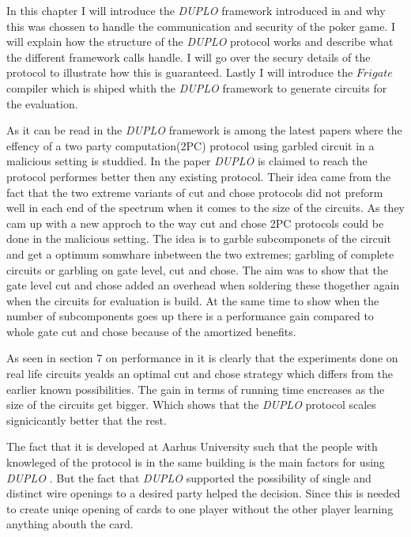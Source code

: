 \documentclass[twoside,11pt,openright]{report}
\newcommand{\DUPLO}{\textit{DUPLO} }
\begin{document}
In this chapter I will introduce the \DUPLO framework introduced in  and why this was chossen to handle the communication and security of the poker game. I will explain how the structure of the \DUPLO protocol works and describe what the different framework calls handle. I will go over the secury details of the protocol to illustrate how this is guaranteed. Lastly I will introduce the $Frigate$ compiler which is shiped whith the \DUPLO framework to generate circuits for the evaluation.

\bigskip

As it can be read in  the \DUPLO framework is among the latest papers where the effency of a two party computation(2PC) protocol using garbled circuit in a malicious setting is studdied. In the paper \DUPLO is claimed to reach the protocol performes better then any existing protocol. Their idea came from the fact that the two extreme variants of cut and chose protocols did not preform well in each end of the spectrum when it comes to the size of the circuits. As they cam up with a new approch to the way cut and chose 2PC protocols could be done in the malicious setting. The idea is to garble subcomponets of the circuit and get a optimum somwhare inbetween the two extremes; garbling of complete circuits or garbling on gate level, cut and chose. The aim was to show that the gate level cut and chose added an overhead when soldering these thogether again when the circuits for evaluation is build. At the same time to show when the number of subcomponents goes up there is a performance gain compared to whole gate cut and chose because of the amortized benefits. 

As seen in section 7 on performance in  it is clearly that the experiments done on real life circuits yealds an optimal cut and chose strategy which differs from the earlier known possibilities. The gain in terms of running time encreases as the size of the circuits get bigger. Which shows that the \DUPLO protocol scales signicicantly better that the rest.

\bigskip

The fact that it is developed at Aarhus University such that the people with knowleged of the protocol is in the same building is the main factors for using \DUPLO. But the fact that \DUPLO supported the possibility of single and distinct wire openings to a desired party helped the decision. Since this is needed to create uniqe opening of cards to one player without the other player learning anything abouth the card.
\end{document}
